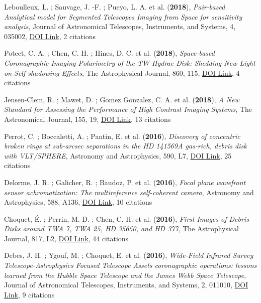 \documentclass[11pt, a4paper, french]{article}
\begin{document}
\begin{etaremune}
 \item Leboulleux, L. ; Sauvage, J. -F. ; Pueyo, L. A. et al. ({\bf2018}), {\it Pair-based Analytical model for Segmented Telescopes Imaging from Space for sensitivity analysis}, Journal of Astronomical Telescopes, Instruments, and Systems, 4, 035002, \href{https://doi.org/10.1117/1.JATIS.4.3.035002}{DOI Link}, 2 citations

 \item Poteet, C. A. ; Chen, C. H. ; Hines, D. C. et al. ({\bf2018}), {\it Space-based Coronagraphic Imaging Polarimetry of the TW Hydrae Disk: Shedding New Light on Self-shadowing Effects}, The Astrophysical Journal, 860, 115, \href{https://doi.org/10.3847/1538-4357/aac2e4}{DOI Link}, 4 citations

 \item Jensen-Clem, R. ; Mawet, D. ; Gomez Gonzalez, C. A. et al. ({\bf2018}), {\it A New Standard for Assessing the Performance of High Contrast Imaging Systems}, The Astronomical Journal, 155, 19, \href{https://doi.org/10.3847/1538-3881/aa97e4}{DOI Link}, 13 citations

 \item Perrot, C. ; Boccaletti, A. ; Pantin, E. et al. ({\bf2016}), {\it Discovery of concentric broken rings at sub-arcsec separations in the HD 141569A gas-rich, debris disk with VLT/SPHERE}, Astronomy and Astrophysics, 590, L7, \href{https://doi.org/10.1051/0004-6361/201628396}{DOI Link}, 25 citations

 \item Delorme, J. R. ; Galicher, R. ; Baudoz, P. et al. ({\bf2016}), {\it Focal plane wavefront sensor achromatization: The multireference self-coherent camera}, Astronomy and Astrophysics, 588, A136, \href{https://doi.org/10.1051/0004-6361/201527657}{DOI Link}, 10 citations

 \item Choquet, {\'E}. ; Perrin, M. D. ; Chen, C. H. et al. ({\bf2016}), {\it First Images of Debris Disks around TWA 7, TWA 25, HD 35650, and HD 377}, The Astrophysical Journal, 817, L2, \href{https://doi.org/10.3847/2041-8205/817/1/L2}{DOI Link}, 44 citations

 \item Debes, J. H. ; Ygouf, M. ; Choquet, E. et al. ({\bf2016}), {\it Wide-Field Infrared Survey Telescope-Astrophysics Focused Telescope Assets coronagraphic operations: lessons learned from the Hubble Space Telescope and the James Webb Space Telescope}, Journal of Astronomical Telescopes, Instruments, and Systems, 2, 011010, \href{https://doi.org/10.1117/1.JATIS.2.1.011010}{DOI Link}, 9 citations


\end{etaremune}
\end{document}
